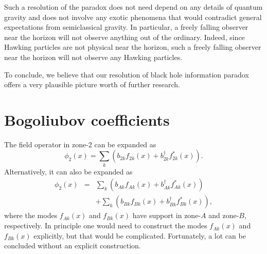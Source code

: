\documentclass[12pt]{article}
\begin{document}
Such a resolution of the paradox does not need depend on any details of quantum gravity and does not involve 
any exotic phenomena that would contradict general expectations from semiclassical gravity.
In particular, a freely falling observer near the horizon will not observe anything out of the ordinary.
Indeed, since Hawking particles are not physical near the horizon, such a freely falling observer near the horizon 
will not observe any Hawking particles.         

To conclude, we believe that our resolution of black hole information paradox 
offers a very plausible picture worth of further research.
        

\appendix

\section{Bogoliubov coefficients}

The field operator in zone-2 can be expanded as \cite{bd}
\begin{equation}\label{ap1}
 \phi_2(x)=\sum_k \left( b_{2k} f_{2k}(x) + b_{2k}^\dagger f_{2k}^*(x) \right) .
\end{equation}
Alternatively, it can also be expanded as
\begin{eqnarray}\label{ap2}
 \phi_2(x) &=& \sum_k \left( b_{Ak} f_{Ak}(x) + b_{Ak}^\dagger f_{Ak}^*(x) \right)
\nonumber \\
& & + \sum_k \left( b_{Bk} f_{Bk}(x) + b_{Bk}^\dagger f_{Bk}^*(x) \right),
\end{eqnarray}
where the modes $f_{Ak}(x)$ and $f_{Bk}(x)$ have support in zone-$A$ and zone-$B$, respectively.
In principle one would need to construct the modes $f_{Ak}(x)$ and $f_{Bk}(x)$ explicitly, 
but that would be complicated. Fortunately, a lot can be concluded 
without an explicit construction.
\end{document}
